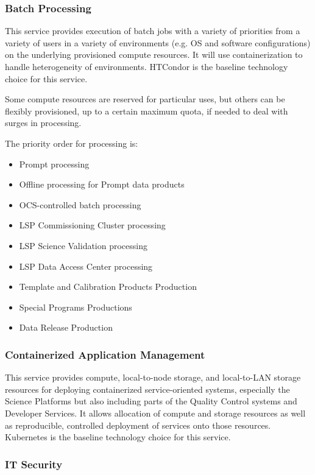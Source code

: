 \documentclass[DM,toc,lsstdraft]{lsstdoc}
\begin{document}
\subsubsection{Batch Processing}\label{batch-processing}

This service provides execution of batch jobs with a variety of priorities from a variety of users in a variety of environments (e.g. OS and software configurations) on the underlying provisioned compute resources.
It will use containerization to handle heterogeneity of environments.
HTCondor is the baseline technology choice for this service.

Some compute resources are reserved for particular uses, but others can
be flexibly provisioned, up to a certain maximum quota, if needed to
deal with surges in processing.

The priority order for processing is:
\begin{itemize}
\item
  Prompt processing
\item
  Offline processing for Prompt data products
\item
  OCS-controlled batch processing
\item
  LSP Commissioning Cluster processing
\item
  LSP Science Validation processing
\item
  LSP Data Access Center processing
\item
  Template and Calibration Products Production
\item
  Special Programs Productions
\item
  Data Release Production
\end{itemize}

\subsubsection{Containerized Application Management}\label{containerized-application-management}

This service provides compute, local-to-node storage, and local-to-LAN storage resources for deploying containerized service-oriented systems, especially the Science Platforms but also including parts of the Quality Control systems and Developer Services.
It allows allocation of compute and storage resources as well as reproducible, controlled deployment of services onto those resources.
Kubernetes is the baseline technology choice for this service.

\subsubsection{IT Security}\label{it-security}
\end{document}
